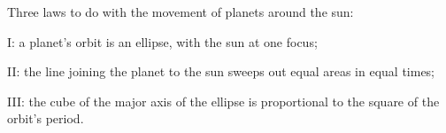 Three laws to do with the movement of planets around the sun:
\par
I: a planet's orbit is an ellipse, with the sun at one focus;
\par
II: the line joining the planet to the sun sweeps out
equal areas in equal times;
\par
III: the cube of the major axis of the ellipse is
proportional to the square of the orbit's period.